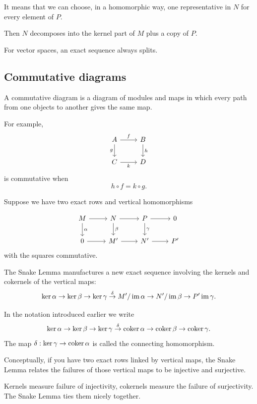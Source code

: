 \documentclass[11pt]{article}
\begin{document}
It means that we can choose, in a homomorphic way, 
one representative in $N$ for every element of $P$. 

Then $N$ decomposes into 
the kernel part of $M$ plus a copy of $P$.  

For vector spaces, an exact sequence 
always splits. 

\subsection{Commutative diagrams}

\begin{defn}
    A commutative diagram is a diagram of modules 
    and maps in which every path from 
    one objects to another gives the same map. 
\end{defn}

For example, 
\[
\begin{tikzcd}
A \arrow[r, "f"] \arrow[d, "g"'] & B \arrow[d, "h"] \\
C \arrow[r, "k"']                 & D
\end{tikzcd}
\]
is commutative when 
\[
    h \circ f = k \circ g. 
\]

Suppose we have two exact rows and vertical 
homomorphisms 

\[
\begin{tikzcd}
M \arrow[r, ""] \arrow[d, "\alpha"] & N \arrow[d, "\beta"] 
\arrow[r, ""] & P \arrow[d, "\gamma"] \arrow[r,""] & 0 \\
0 \arrow[r, ""] & M' \arrow[r, ""] & N' \arrow[r, ""] 
& P' 
\end{tikzcd}
\]
with the squares commutative. 

The Snake Lemma manufactures a new exact sequence 
involving the kernels and cokernels of the 
vertical maps: 
\[
    \ker \alpha \to \ker \beta 
    \to \ker \gamma \overset{\delta}\to M'/\operatorname{im}\alpha 
    \to N'/\operatorname{im}\beta \to P'\operatorname{im}\gamma. 
\]

In the notation introduced earlier we write 
\[
    \ker \alpha \to \ker \beta \to \ker \gamma 
    \overset{\delta}\to \operatorname{coker} \alpha 
    \to \operatorname{coker} \beta \to \operatorname{coker} \gamma. 
\]
The map $\delta : \ker \gamma \to \operatorname{coker} \alpha$ is 
called the connecting homomorphism. 

Conceptually, if you have 
two exact rows linked by vertical maps, 
the Snake Lemma relates the failures of those 
vertical maps to be injective and surjective. 

Kernels measure failure of injectivity, cokernels 
measure the failure of surjectivity. The Snake Lemma 
ties them nicely together. 
\end{document}
